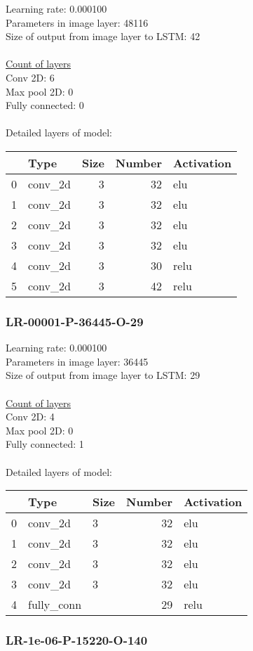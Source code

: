 Learning rate: 0.000100
\\Parameters in image layer: 48116
\\Size of output from image layer to LSTM: 42
\\\\\underline{Count of layers} 
\\Conv 2D:           6\\Max pool 2D:      0\\Fully connected:  0
\\\\Detailed layers of model: \\\begin{tabular}{rlrrl}
\hline
    & Type    &   Size &   Number & Activation   \\
\hline
  0 & conv\_2d &      3 &       32 & elu          \\
  1 & conv\_2d &      3 &       32 & elu          \\
  2 & conv\_2d &      3 &       32 & elu          \\
  3 & conv\_2d &      3 &       32 & elu          \\
  4 & conv\_2d &      3 &       30 & relu         \\
  5 & conv\_2d &      3 &       42 & relu         \\
\hline
\end{tabular}\subsubsection*{LR-00001-P-36445-O-29}
Learning rate: 0.000100
\\Parameters in image layer: 36445
\\Size of output from image layer to LSTM: 29
\\\\\underline{Count of layers} 
\\Conv 2D:           4\\Max pool 2D:      0\\Fully connected:  1
\\\\Detailed layers of model: \\\begin{tabular}{rllrl}
\hline
    & Type       & Size   &   Number & Activation   \\
\hline
  0 & conv\_2d    & 3      &       32 & elu          \\
  1 & conv\_2d    & 3      &       32 & elu          \\
  2 & conv\_2d    & 3      &       32 & elu          \\
  3 & conv\_2d    & 3      &       32 & elu          \\
  4 & fully\_conn &        &       29 & relu         \\
\hline
\end{tabular}\subsubsection*{LR-1e-06-P-15220-O-140}
